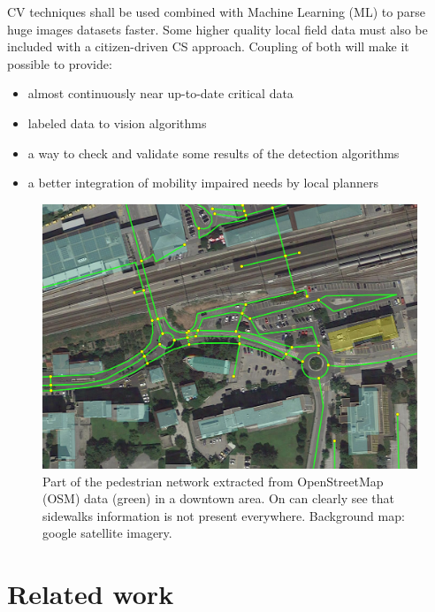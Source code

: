 \documentclass[10pt,conference,a4paper]{IEEEtran}
\begin{document}
CV techniques shall be used combined with Machine Learning (ML) to parse huge images datasets faster. Some higher quality local field data must also be included with a citizen-driven CS approach. Coupling of both will make it possible to provide:
\begin{itemize}\renewcommand\labelitemi{--} 
\setlength\itemsep{0.08em} 
\setlength{\itemindent}{-0.64em}
\item almost continuously near up-to-date critical data
\item labeled data to vision algorithms
\item a way to check and validate some results of the detection algorithms
\item a better integration of mobility impaired needs by local planners
\end{itemize}


\begin{figure}[t]
\begin{center}
\includegraphics[width=1.0\linewidth]{OSM_walk_graph_02.jpg}
\end{center}
   \caption{Part of the pedestrian network extracted from OpenStreetMap (OSM) data (green) in a downtown area. On can clearly see that sidewalks information is not present everywhere. Background map: google satellite imagery. }\label{pedestriangraph}
\end{figure}

\section{Related work}
\end{document}
